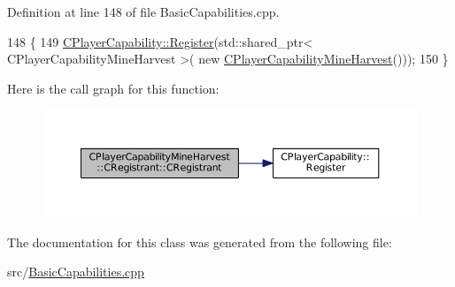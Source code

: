 Definition at line 148 of file Basic\+Capabilities.\+cpp.


\begin{DoxyCode}
148                                                     \{
149     \hyperlink{classCPlayerCapability_a7e298018dcde2684451add3cfff065f7}{CPlayerCapability::Register}(std::shared\_ptr< CPlayerCapabilityMineHarvest >(\textcolor{keyword}{
      new} \hyperlink{classCPlayerCapabilityMineHarvest_aa170d0c33386809d234b73a2b0cf516d}{CPlayerCapabilityMineHarvest}()));   
150 \}
\end{DoxyCode}
Here is the call graph for this function\+:\nopagebreak
\begin{figure}[H]
\begin{center}
\leavevmode
\includegraphics[width=350pt]{classCPlayerCapabilityMineHarvest_1_1CRegistrant_a5d672b383de5f1539b5ca0cc9f18674d_cgraph}
\end{center}
\end{figure}


The documentation for this class was generated from the following file\+:\begin{DoxyCompactItemize}
\item 
src/\hyperlink{BasicCapabilities_8cpp}{Basic\+Capabilities.\+cpp}\end{DoxyCompactItemize}
